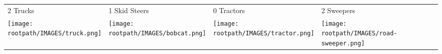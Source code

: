 \begin{tabular}{m{}m{}m{}m{}}
    {\color{ccorange} 2 Trucks} & {\color{ccorange} 1 Skid Steers} & {\color{ccorange} 0 Tractors} & {\color{ccorange} 2 Sweepers} \\
    \texttt{[image: \\rootpath/IMAGES/truck.png]}  & \texttt{[image: \\rootpath/IMAGES/bobcat.png]} & \texttt{[image: \\rootpath/IMAGES/tractor.png]} & \texttt{[image: \\rootpath/IMAGES/road-sweeper.png]}                         
    \end{tabular}